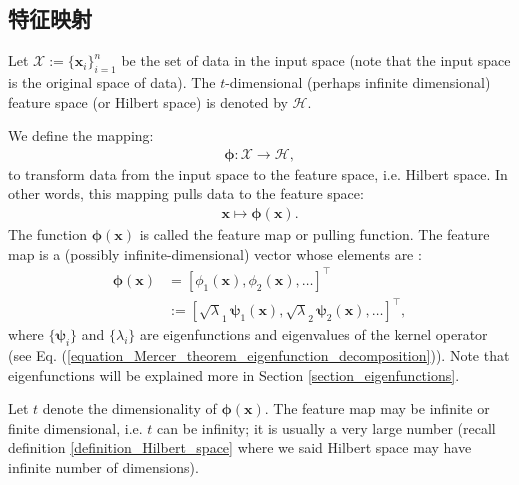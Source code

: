 \documentclass[lang=cn,10pt]{gorgeousnbook}
\numberwithin{equation}{section}%
\numberwithin{figure}{section}%
\begin{document}
\subsection{特征映射}\label{section_feature_map}

Let $\mathcal{X} := \{\boldsymbol{x}_i\}_{i=1}^n$ be the set of data in the input space (note that the input space is the original space of data). The $t$-dimensional (perhaps infinite dimensional) feature space (or Hilbert space) is denoted by $\mathcal{H}$. 

\begin{definition}
We define the mapping:
\begin{align}
\boldsymbol{\phi}: \mathcal{X} \rightarrow \mathcal{H}, 
\end{align}
to transform data from the input space to the feature space, i.e. Hilbert space. In other words, this mapping pulls data to the feature space:
\begin{align}\label{equation_pulling_mapping}
\boldsymbol{x} \mapsto \boldsymbol{\phi}(\boldsymbol{x}).
\end{align}
The function $\boldsymbol{\phi}(\boldsymbol{x})$ is called the feature map or pulling function. 
The feature map is a (possibly infinite-dimensional) vector whose elements are \cite{minh2006mercer}:
\begin{equation}\label{equation_feature_map}
\begin{aligned}
\boldsymbol{\phi}(\boldsymbol{x}) &= [\phi_1(\boldsymbol{x}), \phi_2(\boldsymbol{x}), \dots]^\top \\
&:= [\sqrt{\lambda}_1\, \boldsymbol{\psi}_1(\boldsymbol{x}), \sqrt{\lambda}_2\, \boldsymbol{\psi}_2(\boldsymbol{x}), \dots]^\top,
\end{aligned}
\end{equation}
where $\{\boldsymbol{\psi}_i\}$ and $\{\lambda_i\}$ are eigenfunctions and eigenvalues of the kernel operator (see Eq. (\ref{equation_Mercer_theorem_eigenfunction_decomposition})). Note that eigenfunctions will be explained more in Section \ref{section_eigenfunctions}.
\end{definition}
Let $t$ denote the dimensionality of $\boldsymbol{\phi}(\boldsymbol{x})$.
The feature map may be infinite or finite dimensional, i.e. $t$ can be infinity; it is usually a very large number (recall definition \ref{definition_Hilbert_space} where we said Hilbert space may have infinite number of dimensions). 
\end{document}
